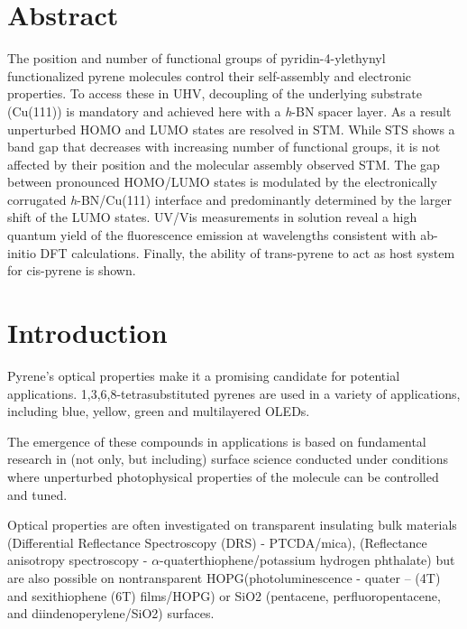 \label{section:pyrene}
\section{Abstract}
The position and number of functional groups of pyridin-4-ylethynyl functionalized pyrene molecules control their self-assembly and electronic properties. To access these in UHV, decoupling of the underlying substrate (Cu(111)) is mandatory and achieved here with a \textit{h}-BN spacer layer. As a result unperturbed HOMO and LUMO states are resolved in STM. While STS shows a band gap that decreases with increasing number of functional groups, it is not affected by their position and the molecular assembly observed STM. The gap between pronounced HOMO/LUMO states is modulated by the electronically corrugated \textit{h}-BN/Cu(111) interface and predominantly determined by the larger shift of the LUMO states. UV/Vis measurements in solution reveal a high quantum yield of the fluorescence emission at wavelengths consistent with ab-initio DFT calculations. Finally, the ability of trans-pyrene to act as host system for cis-pyrene is shown.

\section{Introduction}
Pyrene’s optical properties\cite{Figueira-Duarte_Pyrene_2011} make it a promising candidate for potential applications. 1,3,6,8-tetrasubstituted pyrenes are used in a variety of applications, including blue\cite{Moorthy_Steric_2007,Sonar_pyrenes_2010,Feng_Pyrene_2012}, yellow\cite{Sonar_pyrenes_2010}, green\cite{Chang_efficient_2012} and multilayered\cite{Thomas_pyrene_2012} OLEDs. 

The emergence of these compounds in applications is based on fundamental research in (not only, but including) surface science conducted under conditions where unperturbed photophysical properties of the molecule can be controlled and tuned. 

Optical properties are often investigated on transparent insulating bulk materials (Differential Reflectance Spectroscopy (DRS) - PTCDA/mica)\cite{Proehl_Formation_2004}, (Reflectance anisotropy spectroscopy - $\alpha$-quaterthiophene/potassium hydrogen phthalate)\cite{Bussetti_reflectance_2009} but are also possible on nontransparent HOPG(photoluminescence - quater – (4T) and sexithiophene (6T) films/HOPG)\cite{Schneider_Morphology_2002} or SiO2 (pentacene, perfluoropentacene, and diindenoperylene/SiO2)\cite{Heinemeyer_Real-Time_2010} surfaces. 


